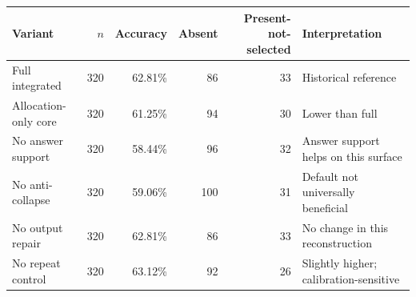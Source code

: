 \begin{tabularx}{\textwidth}{@{}lrrrrY@{}}
\toprule
Variant & $n$ & Accuracy & Absent & Present-not-selected & Interpretation \\
\midrule
Full integrated & 320 & 62.81\% & 86 & 33 & Historical reference \\
Allocation-only core & 320 & 61.25\% & 94 & 30 & Lower than full \\
No answer support & 320 & 58.44\% & 96 & 32 & Answer support helps on this surface \\
No anti-collapse & 320 & 59.06\% & 100 & 31 & Default not universally beneficial \\
No output repair & 320 & 62.81\% & 86 & 33 & No change in this reconstruction \\
No repeat control & 320 & 63.12\% & 92 & 26 & Slightly higher; calibration-sensitive \\
\bottomrule
\end{tabularx}
